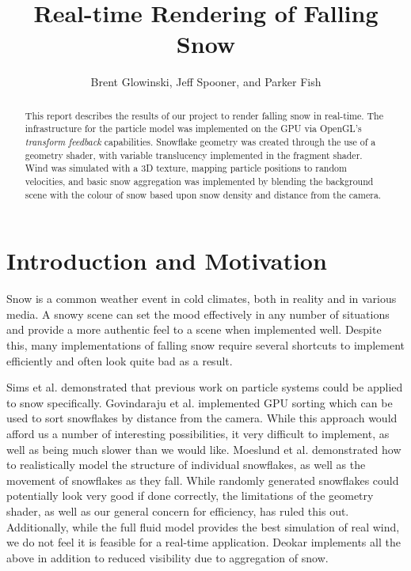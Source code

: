 \documentclass[conference]{acmsiggraph}
\title{Real-time Rendering of Falling Snow}
\author{Brent Glowinski, Jeff Spooner, and Parker Fish}
\begin{document}
\maketitle

\begin{abstract}
This report describes the results of our project to render falling snow in real-time. The infrastructure for the particle model was implemented on the GPU via OpenGL's \textit{transform feedback} capabilities. Snowflake geometry was created through the use of a geometry shader, with variable translucency implemented in the fragment shader. Wind was simulated with a 3D texture, mapping particle positions to random velocities, and basic snow aggregation was implemented by blending the background scene with the colour of snow based upon snow density and distance from the camera.

\end{abstract}

\keywordlist

\copyrightspace

\section{Introduction and Motivation}
Snow is a common weather event in cold climates, both in reality and in various media. A snowy scene can set the mood effectively in any number of situations and provide a more authentic feel to a scene when implemented well. Despite this, many implementations of falling snow require several shortcuts to implement efficiently and often look quite bad as a result.

Sims et al. \cite{sims90} demonstrated that previous work on particle systems could be applied to snow specifically. Govindaraju et al. \cite{govindaraju05} implemented GPU sorting which can be used to sort snowflakes by distance from the camera. While this approach would afford us a number of interesting possibilities, it very difficult to implement, as well as being much slower than we would like. Moeslund et al. \cite{moeslund05} demonstrated how to realistically model the structure of individual snowflakes, as well as the movement of snowflakes as they fall. While randomly generated snowflakes could potentially look very good if done correctly, the limitations of the geometry shader, as well as our general concern for efficiency, has ruled this out. Additionally, while the full fluid model provides the best simulation of real wind, we do not feel it is feasible for a real-time application. Deokar \cite{deokar09} implements all the above in addition to reduced visibility due to aggregation of snow. 
\end{document}
